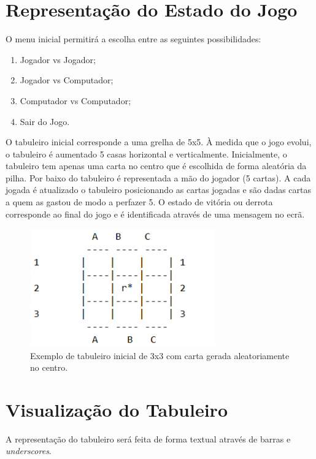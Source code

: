 \documentclass[a4paper]{article}
\begin{document}
\section{Representação do Estado do Jogo}

O menu inicial permitirá a escolha entre as seguintes possibilidades:

\begin{enumerate}
	\item Jogador vs Jogador;
	\item Jogador vs Computador;
	\item Computador vs Computador;
	\item Sair do Jogo. 
\end{enumerate}

\par
O tabuleiro inicial corresponde a uma grelha de 5x5. À medida que o jogo evolui, o tabuleiro é aumentado 5 casas horizontal e verticalmente. Inicialmente, o tabuleiro tem apenas uma carta no centro que é escolhida de forma aleatória da pilha. Por baixo do tabuleiro é representada a mão do jogador (5 cartas). A cada jogada é atualizado o tabuleiro posicionando as cartas jogadas e são dadas cartas a quem as gastou de modo a perfazer 5. O estado de vitória ou derrota corresponde ao final do jogo e é identificada através de uma mensagem no ecrã.

\begin{figure}[hb!]
\centering
\includegraphics[width=80mm]{estado.jpg}
\caption{Exemplo de tabuleiro inicial de 3x3 com carta gerada aleatoriamente no centro. \label{estado}}
\end{figure}

\section{Visualização do Tabuleiro}

A representação do tabuleiro será feita de forma textual através de barras e \textit{underscores}.
\end{document}
